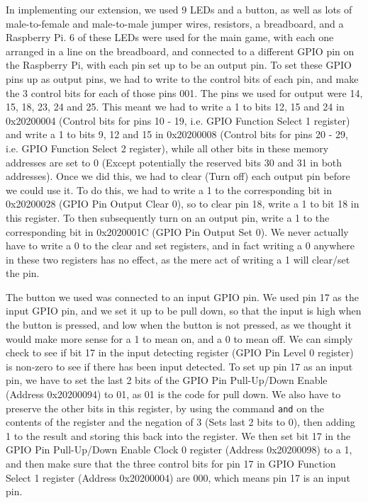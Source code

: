 \documentclass[a4wide, 10pt]{article}
\begin{document}
In implementing our extension, we used 9 LEDs and a button, as well as lots of male-to-female and male-to-male jumper wires, resistors, a breadboard, and a Raspberry Pi. 6 of these LEDs were used for the main game, with each one arranged in a line on the breadboard, and connected to a different GPIO pin on the Raspberry Pi, with each pin set up to be an output pin. To set these GPIO pins up as output pins, we had to write to the control bits of each pin, and make the 3 control bits for each of those pins 001. The pins we used for output were 14, 15, 18, 23, 24 and 25. This meant we had to write a 1 to bits 12, 15 and 24 in 0x20200004 (Control bits for pins 10 - 19, i.e. GPIO Function Select 1 register) and write a 1 to bits 9, 12 and 15 in 0x20200008 (Control bits for pins 20 - 29, i.e. GPIO Function Select 2 register), while all other bits in these memory addresses are set to 0 (Except potentially the reserved bits 30 and 31 in both addresses). Once we did this, we had to clear (Turn off) each output pin before we could use it. To do this, we had to write a 1 to the corresponding bit in 0x20200028 (GPIO Pin Output Clear 0), so to clear pin 18, write a 1 to bit 18 in this register. To then subsequently turn on an output pin, write a 1 to the corresponding bit in 0x2020001C (GPIO Pin Output Set 0). We never actually have to write a 0 to the clear and set registers, and in fact writing a 0 anywhere in these two registers has no effect, as the mere act of writing a 1 will clear/set the pin.

The button we used was connected to an input GPIO pin. We used pin 17 as the input GPIO pin, and we set it up to be pull down, so that the input is high when the button is pressed, and low when the button is not pressed, as we thought it would make more sense for a 1 to mean on, and a 0 to mean off. We can simply check to see if bit 17 in the input detecting register (GPIO Pin Level 0 register) is non-zero to see if there has been input detected. To set up pin 17 as an input pin, we have to set the last 2 bits of the GPIO Pin Pull-Up/Down Enable (Address 0x20200094) to 01, as 01 is the code for pull down. We also have to preserve the other bits in this register, by using the command \texttt{and} on the contents of the register and the negation of 3 (Sets last 2 bits to 0), then adding 1 to the result and storing this back into the register. We then set bit 17 in the GPIO Pin Pull-Up/Down Enable Clock 0 register (Address 0x20200098) to a 1, and then make sure that the three control bits for pin 17 in GPIO Function Select 1 register (Address 0x20200004) are 000, which means pin 17 is an input pin.
\end{document}

